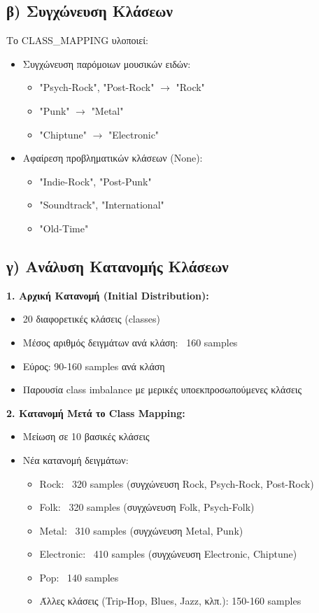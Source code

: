 \documentclass[a4paper,12pt]{article}
\begin{document}
\subsection*{β) Συγχώνευση Κλάσεων}

Το CLASS\_MAPPING υλοποιεί:
\begin{itemize}
   \item Συγχώνευση παρόμοιων μουσικών ειδών:
   \begin{itemize}
       \item "Psych-Rock", "Post-Rock" $\rightarrow$ "Rock"
       \item "Punk" $\rightarrow$ "Metal"
       \item "Chiptune" $\rightarrow$ "Electronic"
   \end{itemize}
   \item Αφαίρεση προβληματικών κλάσεων (None):
   \begin{itemize}
       \item "Indie-Rock", "Post-Punk"
       \item "Soundtrack", "International"
       \item "Old-Time"
   \end{itemize}
\end{itemize}

\subsection*{γ) Ανάλυση Κατανομής Κλάσεων}

\textbf{1. Αρχική Κατανομή (Initial Distribution):}
\begin{itemize}
   \item 20 διαφορετικές κλάσεις (classes)
   \item Μέσος αριθμός δειγμάτων ανά κλάση: ~160 samples
   \item Εύρος: 90-160 samples ανά κλάση
   \item Παρουσία class imbalance με μερικές υποεκπροσωπούμενες κλάσεις
\end{itemize}

\textbf{2. Κατανομή Μετά το Class Mapping:}
\begin{itemize}
   \item Μείωση σε 10 βασικές κλάσεις
   \item Νέα κατανομή δειγμάτων:
   \begin{itemize}
       \item Rock: ~320 samples (συγχώνευση Rock, Psych-Rock, Post-Rock)
       \item Folk: ~320 samples (συγχώνευση Folk, Psych-Folk)
       \item Metal: ~310 samples (συγχώνευση Metal, Punk)
       \item Electronic: ~410 samples (συγχώνευση Electronic, Chiptune)
       \item Pop: ~140 samples
       \item Άλλες κλάσεις (Trip-Hop, Blues, Jazz, κλπ.): 150-160 samples
   \end{itemize}
\end{itemize}
\end{document}
